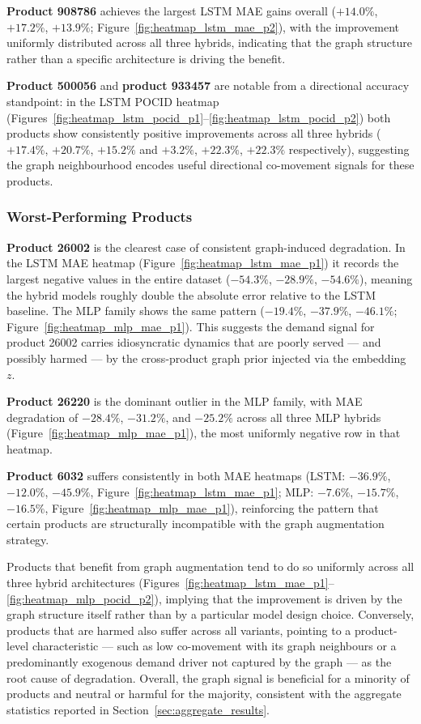 \textbf{Product 908786} achieves the largest LSTM MAE gains overall (\(+14.0\%\), 
\(+17.2\%\), \(+13.9\%\); Figure~\ref{fig:heatmap_lstm_mae_p2}), with the 
improvement uniformly distributed across all three hybrids, indicating that the 
graph structure rather than a specific architecture is driving the benefit.

\textbf{Product 500056} and \textbf{product 933457} are notable from a directional 
accuracy standpoint: in the LSTM POCID heatmap 
(Figures~\ref{fig:heatmap_lstm_pocid_p1}--\ref{fig:heatmap_lstm_pocid_p2}) both 
products show consistently positive improvements across all three hybrids 
(\(+17.4\%\), \(+20.7\%\), \(+15.2\%\) and \(+3.2\%\), \(+22.3\%\), \(+22.3\%\) 
respectively), suggesting the graph neighbourhood encodes useful directional 
co-movement signals for these products.

\subsubsection*{Worst-Performing Products}

\textbf{Product 26002} is the clearest case of consistent graph-induced degradation. 
In the LSTM MAE heatmap (Figure~\ref{fig:heatmap_lstm_mae_p1}) it records the 
largest negative values in the entire dataset (\(-54.3\%\), \(-28.9\%\), 
\(-54.6\%\)), meaning the hybrid models roughly double the absolute error relative 
to the LSTM baseline. The MLP family shows the same pattern (\(-19.4\%\), 
\(-37.9\%\), \(-46.1\%\); Figure~\ref{fig:heatmap_mlp_mae_p1}). This suggests the 
demand signal for product 26002 carries idiosyncratic dynamics that are poorly 
served — and possibly harmed — by the cross-product graph prior injected via the 
embedding $z$.

\textbf{Product 26220} is the dominant outlier in the MLP family, with MAE 
degradation of \(-28.4\%\), \(-31.2\%\), and \(-25.2\%\) across all three MLP 
hybrids (Figure~\ref{fig:heatmap_mlp_mae_p1}), the most uniformly negative row 
in that heatmap.

\textbf{Product 6032} suffers consistently in both MAE heatmaps 
(LSTM: \(-36.9\%\), \(-12.0\%\), \(-45.9\%\), Figure~\ref{fig:heatmap_lstm_mae_p1}; 
MLP: \(-7.6\%\), \(-15.7\%\), \(-16.5\%\), Figure~\ref{fig:heatmap_mlp_mae_p1}), 
reinforcing the pattern that certain products are structurally incompatible with 
the graph augmentation strategy.


Products that benefit from graph augmentation tend to do so uniformly across all 
three hybrid architectures (Figures~\ref{fig:heatmap_lstm_mae_p1}--\ref{fig:heatmap_mlp_pocid_p2}), 
implying that the improvement is driven by the graph structure itself rather than 
by a particular model design choice. Conversely, products that are harmed also 
suffer across all variants, pointing to a product-level characteristic — such as 
low co-movement with its graph neighbours or a predominantly exogenous demand 
driver not captured by the graph — as the root cause of degradation. Overall, the 
graph signal is beneficial for a minority of products and neutral or harmful for 
the majority, consistent with the aggregate statistics reported in 
Section~\ref{sec:aggregate_results}.

